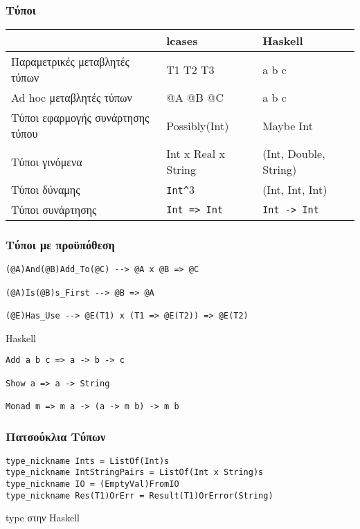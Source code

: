 \documentclass{beamer}
\def\e{\foreignlanguage{english}}
\def\h{\e{Haskell}}
\begin{document}
\begin{frame}

\frametitle{Τύποι}

\begin{center}
\begin{tabular}{ |M{2.5cm}|M{3cm}|M{4.3cm}| }
 \hline
 & \e{lcases} & \h
 \\
 \hline
 Παραμετρικές μεταβλητές τύπων & T1 T2 T3 & \e{a b c}
 \\
 \hline
 \e{Ad hoc} μεταβλητές τύπων & \e{@A @B @C} & \e{a b c}
 \\
 \hline
 Τύποι εφαρμογής συνάρτησης τύπου & \e{Possibly(Int)} & \e{Maybe Int}
 \\
 \hline
 Τύποι γινόμενα & \e{Int x Real x String} & \e{(Int, Double, String)}
 \\
 \hline
 Τύποι δύναμης & \e{\texttt{Int\^}}\e{3} & \e{(Int, Int, Int)}
 \\
 \hline
 Τύποι συνάρτησης & \e{\texttt{Int => Int}} & \e{\texttt{Int -> Int}}
 \\
 \hline
\end{tabular}
\end{center}

\end{frame}

\begin{frame}[fragile]

\frametitle{Τύποι με προϋπόθεση}

\begin{otherlanguage}{english}
\begin{verbatim}
(@A)And(@B)Add_To(@C) --> @A x @B => @C

(@A)Is(@B)s_First --> @B => @A

(@E)Has_Use --> @E(T1) x (T1 => @E(T2)) => @E(T2)

\end{verbatim}
\h
\begin{verbatim}
Add a b c => a -> b -> c

Show a => a -> String

Monad m => m a -> (a -> m b) -> m b
\end{verbatim}
\end{otherlanguage}

\end{frame}

\begin{frame}[fragile]

\frametitle{Πατσούκλια Τύπων}

\begin{otherlanguage}{english}
\begin{verbatim}
type_nickname Ints = ListOf(Int)s
type_nickname IntStringPairs = ListOf(Int x String)s
type_nickname IO = (EmptyVal)FromIO
type_nickname Res(T1)OrErr = Result(T1)OrError(String)

\end{verbatim}
\end{otherlanguage}

\e{type} στην \h

\end{frame}
\end{document}
